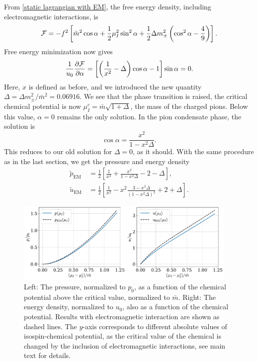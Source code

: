 From \autoref{static lagrangian with EM}, the free energy density, including electromagnetic interactions, is
%
\begin{equation}
    \mathcal{F} =
    - f^2 \left[
        \bar m^2 \cos \alpha 
        + \frac{1}{2} \mu_I^2 \sin^2 \alpha
        + \frac{1}{2} \Delta m_\pm^2 \left(\cos^2 \alpha - \frac{4}{9}\right)
    \right].
\end{equation}
%
Free energy minimization now gives
%
\begin{equation}
    \frac{1}{u_0}\pdv{\mathcal{F}}{\alpha}
    = 
    \left[ \left( \frac{1}{x^2} - \Delta \right) \cos \alpha - 1\right] \sin \alpha = 0.
\end{equation}
%
Here, $x$ is defined as before, and we introduced the new quantity $\Delta = \Delta m_{\pm}^2 / \bar m^2= 0.06916$.
We see that the phase transition is raised, the critical chemical potential is now $\mu_I^c = \bar m \sqrt{1 + \Delta}$, the mass of the charged pions.
Below this value, $\alpha = 0$ remains the only solution.
In the pion condensate phase, the solution is
%
\begin{equation}
    \cos \alpha = \frac{x^2}{1 -  x^2 \Delta}.
\end{equation}
%
This reduces to our old solution for $\Delta = 0$, as it should.
With the same procedure as in the last section, we get the pressure and energy density
%
\begin{align}
    \tilde p_\text{EM} \
    & = \frac{1}{2} 
    \left[
        \frac{1}{x^2} 
        + \frac{x^2}{1 - x^2 \Delta} 
        - 2 - \Delta
    \right], \\
    \tilde u_\text{EM}
    &= \frac{1}{2} 
    \left[
        \frac{1}{x^2} 
        - x^2 \frac{3 - x^2 \Delta }{(1 - x^2 \Delta)^2}
        + 2 + \Delta
    \right].
\end{align}
%

\begin{figure}[!htb]
    \centering
    \includegraphics[width=0.95\textwidth]{../scripts/figurer/pion_star/pion_up.pdf}
    \caption{
        Left: The pressure, normalized to $p_0$, as a function of the chemical potential above the critical value, normalized to $\bar m$.
        Right: The energy density, normalized to $u_0$, also as a function of the chemical potential.
        Results with electromagnetic interaction are shown as dashed lines.
        The $y$-axis corresponds to different absolute values of isospin-chemical potential, as the critical value of the chemical is changed by the inclusion of electromagnetic interactions, see main text for details.
        }
        \label{fig: pressure and energy with EM interaction}
\end{figure}



